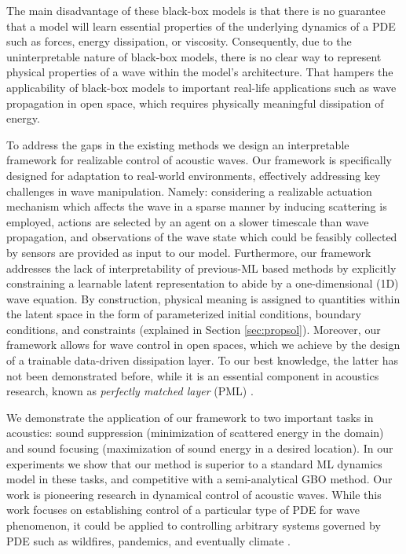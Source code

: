 The main disadvantage of these black-box models is that there is no guarantee that a model will learn essential properties of the underlying dynamics of a PDE such as forces, energy dissipation, or viscosity. Consequently, due to the uninterpretable nature of black-box models, there is no clear way to represent physical properties of a wave within the model's architecture. That hampers the applicability of black-box models to important real-life applications such as wave propagation in open space, which requires physically meaningful dissipation of  energy.

To address the gaps in the existing methods we design an interpretable framework for realizable control of acoustic waves. Our framework is specifically designed for adaptation to real-world environments, effectively addressing key challenges in wave manipulation. Namely: considering a realizable actuation mechanism which affects the wave in a sparse manner by inducing scattering is employed, actions are selected by an agent on a slower timescale than wave propagation, and observations of the wave state which could be feasibly collected by sensors are provided as input to our model. Furthermore, our framework addresses the lack of interpretability \cite{yu2021_interpretability} of previous-ML based methods by explicitly constraining a learnable latent representation to abide by a one-dimensional (1D) wave equation. By construction, physical meaning is assigned to quantities within the latent space in the form of parameterized initial conditions, boundary conditions, and constraints (explained in Section \ref{sec:propsol}). Moreover, our framework allows for wave control in open spaces, which we achieve by the design of a trainable data-driven dissipation layer. To our best knowledge, the latter has not been demonstrated before, while it is an essential component in acoustics research, known as \textit{perfectly matched layer} (PML) \cite{berenger_1994_a, johnson_2021_notes}.

We demonstrate the application of our framework to two important tasks in acoustics: sound suppression (minimization of scattered energy in the domain) and sound focusing (maximization of sound energy in a desired location). In our experiments we show that our method is superior to a standard ML dynamics model in these tasks, and competitive with a semi-analytical GBO method. Our work is pioneering research in dynamical control of acoustic waves. While this work focuses on establishing control of a particular type of PDE for wave phenomenon, it could be applied to controlling arbitrary systems governed by PDE such as wildfires, pandemics, and eventually climate \cite{miguelngeljavaloyes_2023_a, schneider_1974_climate,majid_2021_analysis}. 

